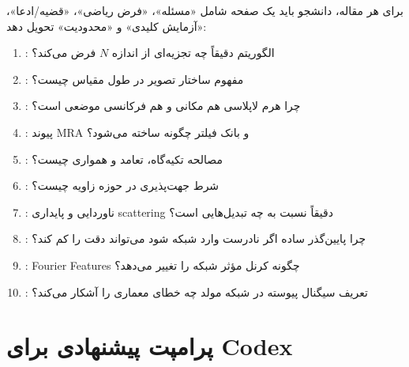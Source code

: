 \documentclass[12pt,openany,oneside]{book}
\begin{document}
برای هر مقاله، دانشجو باید یک صفحه شامل «مسئله»، «فرض ریاضی»، «قضیه/ادعا»، «آزمایش کلیدی» و «محدودیت»
تحویل دهد:
\begin{enumerate}
\item {}: الگوریتم دقیقاً چه تجزیه‌ای از اندازه \(N\) فرض می‌کند؟
\item {}: مفهوم ساختار تصویر در طول مقیاس چیست؟
\item {}: چرا هرم لاپلاسی هم مکانی و هم فرکانسی موضعی است؟
\item {}: پیوند MRA و بانک فیلتر چگونه ساخته می‌شود؟
\item {}: مصالحه تکیه‌گاه، تعامد و همواری چیست؟
\item {}: شرط جهت‌پذیری در حوزه زاویه چیست؟
\item {}: ناوردایی و پایداری scattering دقیقاً نسبت به چه تبدیل‌هایی است؟
\item {}: چرا پایین‌گذر ساده اگر نادرست وارد شبکه شود می‌تواند دقت را کم کند؟
\item {}: Fourier Features چگونه کرنل مؤثر شبکه را تغییر می‌دهد؟
\item {}: تعریف سیگنال پیوسته در شبکه مولد چه خطای معماری را آشکار می‌کند؟
\end{enumerate}

\section{پرامپت پیشنهادی برای Codex}
\end{document}
